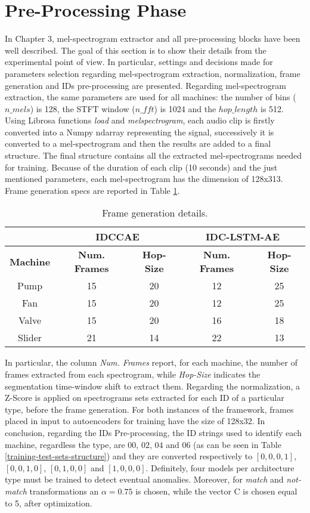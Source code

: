\section{Pre-Processing Phase}
In Chapter 3, mel-spectrogram extractor and all pre-processing blocks have been well described. The goal of this section is to show their details from the experimental point of view. In particular, settings and decisions made for parameters selection regarding mel-spectrogram extraction, normalization, frame generation and IDs pre-processing are presented. Regarding mel-spectrogram extraction, the same parameters are used for all machines: the number of bins ($n\_mels$) is 128, the STFT window ($n\_fft$) is 1024 and the $hop\_length$ is 512. Using Librosa functions \textit{load} and \textit{melspectrogram}, each audio clip is firstly converted into a Numpy ndarray representing the signal, successively it is converted to a mel-spectrogram and then the results are added to a final structure. The final structure contains all the extracted mel-spectrograms needed for training. Because of the duration of each clip (10 seconds) and the just mentioned parameters, each mel-spectrogram has the dimension of 128x313. Frame generation specs are reported in Table \ref{frame-generation}.\\
\begin{table}[ht]
\centering
\begin{tabular}{|c|c|c|c|c|} 
\cline{2-5}
\multicolumn{1}{c|}{} & \multicolumn{2}{c|}{\textbf{IDCCAE}} & \multicolumn{2}{c|}{\textbf{IDC-LSTM-AE}} \\ 
\hline
\textbf{Machine} & \textbf{Num. Frames} & \textbf{Hop-Size} & \textbf{Num. Frames} & \textbf{Hop-Size} \\ 
\hline
Pump & 15 & 20 & 12 & 25  \\ 
\hline
Fan & 15 & 20 & 12 & 25  \\ 
\hline
Valve & 15 & 20 & 16 & 18  \\ 
\hline
Slider & 21 & 14 & 22 & 13  \\
\hline
\end{tabular}
\caption{Frame generation details.}
\label{frame-generation}
\end{table}

In particular, the column \textit{Num. Frames} report, for each machine, the number of frames extracted from each spectrogram, while \textit{Hop-Size} indicates the segmentation time-window shift to extract them. Regarding the normalization, a Z-Score is applied on spectrograms sets extracted for each ID of a particular type, before the frame generation. For both instances of the framework, frames placed in input to autoencoders for training have the size of 128x32. In conclusion, regarding the IDs Pre-processing, the ID strings used to identify each machine, regardless the type, are $00$, $02$, $04$ and $06$ (as can be seen in Table \ref{training-test-sets-structure}) and they are converted respectively to $[0,0,0,1]$, $[0,0,1,0]$, $[0,1,0,0]$ and $[1,0,0,0]$. Definitely, four models per architecture type must be trained to detect eventual anomalies. Moreover, for \textit{match} and \textit{not-match} transformations an $\alpha=0.75$ is chosen, while the vector C is chosen equal to 5, after optimization.

